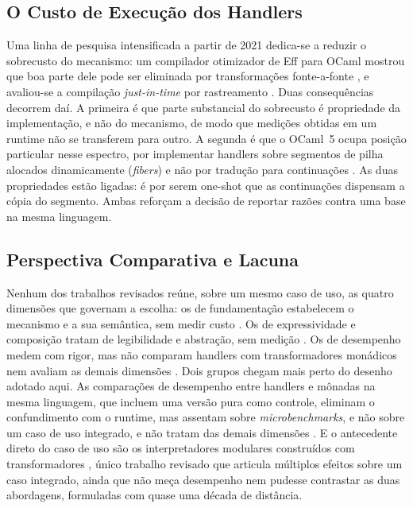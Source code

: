 \documentclass[12pt]{article}
\begin{document}
\subsection{O Custo de Execução dos Handlers}\label{sec:custo}

Uma linha de pesquisa intensificada a partir de 2021 dedica-se a reduzir o
sobrecusto do mecanismo: um compilador otimizador de Eff para OCaml mostrou
que boa parte dele pode ser eliminada por transformações fonte-a-fonte
\cite{karachalias:21}, e avaliou-se a compilação \textit{just-in-time} por
rastreamento \cite{gaissert:25}. Duas consequências decorrem daí. A primeira é
que parte substancial do sobrecusto é propriedade da implementação, e não do
mecanismo, de modo que medições obtidas em um runtime não se
transferem para outro. A
segunda é que o OCaml~5 ocupa posição particular nesse espectro, por
implementar handlers sobre segmentos de pilha alocados dinamicamente
(\textit{fibers}) e não por tradução para continuações
\cite{sivaramakrishnan:21,ocaml:manual}. As duas propriedades estão ligadas: é
por serem one-shot que as continuações dispensam a cópia do
segmento.
Ambas reforçam a decisão de reportar razões contra uma base na mesma
linguagem.

\subsection{Perspectiva Comparativa e Lacuna}\label{sec:lacuna}

Nenhum dos trabalhos revisados reúne, sobre um mesmo caso de uso, as quatro
dimensões que governam a escolha: os de fundamentação estabelecem o mecanismo
e a sua semântica, sem medir custo \cite{plotkin:03,plotkin:09}. Os de
expressividade e composição tratam de legibilidade e abstração, sem medição
\cite{swierstra:08,pretnar:15,lindley:17}. Os de desempenho medem com rigor,
mas não comparam handlers com transformadores monádicos nem avaliam
as demais dimensões \cite{sivaramakrishnan:21,karachalias:21,gaissert:25}.
Dois grupos chegam mais perto do desenho adotado aqui. As comparações de
desempenho entre handlers e mônadas na mesma linguagem, que incluem
uma versão pura como controle, eliminam o confundimento com o
runtime, mas assentam sobre \textit{microbenchmarks}, e não sobre um
caso de uso integrado, e não tratam das demais dimensões
\cite{kammar:13,xie:20}. E o antecedente direto do caso de uso são os interpretadores
modulares construídos com transformadores \cite{liang:95}, único trabalho
revisado que articula múltiplos efeitos sobre um caso integrado, ainda que não
meça desempenho nem pudesse contrastar as duas abordagens, formuladas com
quase uma década de distância.
\end{document}
